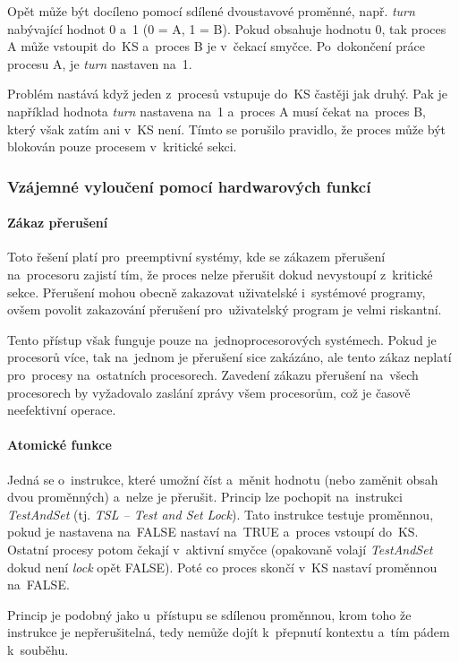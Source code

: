 Opět může být docíleno pomocí sdílené dvoustavové proměnné, např. \emph{turn} nabývající hodnot 0 a~1 (0 = A, 1 = B). Pokud obsahuje hodnotu 0, tak proces A může vstoupit do~KS a~proces B je v~čekací smyčce. Po~dokončení práce procesu A, je \emph{turn} nastaven na~1.

Problém nastává když jeden z~procesů vstupuje do~KS častěji jak druhý. Pak je například hodnota \emph{turn} nastavena na~1 a~proces A musí čekat na~proces B, který však zatím ani v~KS není. Tímto se porušilo pravidlo, že proces může být blokován pouze procesem v~kritické sekci.

\subsubsection{Vzájemné vyloučení pomocí hardwarových funkcí}

\paragraph{Zákaz přerušení}

Toto řešení platí pro~preemptivní systémy, kde se zákazem přerušení na~procesoru zajistí tím, že proces nelze přerušit dokud nevystoupí z~kritické sekce. Přerušení mohou obecně zakazovat uživatelské i~systémové programy, ovšem povolit zakazování přerušení pro~uživatelský program je velmi riskantní.

Tento přístup však funguje pouze na~jednoprocesorových systémech. Pokud je procesorů více, tak na~jednom je přerušení sice zakázáno, ale tento zákaz neplatí pro~procesy na~ostatních procesorech. Zavedení zákazu přerušení na~všech procesorech by vyžadovalo zaslání zprávy všem procesorům, což je časově neefektivní operace.

\paragraph{Atomické funkce}

Jedná se o~instrukce, které umožní číst a~měnit hodnotu (nebo zaměnit obsah dvou proměnných) a~nelze je přerušit. Princip lze pochopit na~instrukci \emph{TestAndSet} (tj. \emph{TSL -- Test and Set Lock}). Tato instrukce testuje proměnnou, pokud je nastavena na~FALSE nastaví na~TRUE a~proces vstoupí do~KS. Ostatní procesy potom čekají v~aktivní smyčce (opakovaně volají \emph{TestAndSet} dokud není \emph{lock} opět FALSE). Poté co proces skončí v~KS nastaví proměnnou na~FALSE.

Princip je podobný jako u~přístupu se sdílenou proměnnou, krom toho že instrukce je nepřerušitelná, tedy nemůže dojít k~přepnutí kontextu a~tím pádem k~souběhu.


